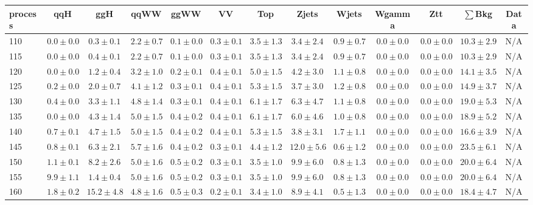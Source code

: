 \begin{table}
{%
 \tiny
 \begin{center}
 \begin{tabular}{l | c c | c c c c c c c c  | c c}
 \hline
 process & qqH & ggH & qqWW & ggWW & VV & Top & Zjets & Wjets & Wgamma & Ztt & $\sum$Bkg & Data \\
 \hline
110 & $0.0\pm0.0$ & $0.3\pm0.1$ & $2.2\pm0.7$ & $0.1\pm0.0$ & $0.3\pm0.1$ & $3.5\pm1.3$ & $3.4\pm2.4$ & $0.9\pm0.7$ & $0.0\pm0.0$ & $0.0\pm0.0$ & $10.3\pm2.9$ & N/A \\
115 & $0.0\pm0.0$ & $0.4\pm0.1$ & $2.2\pm0.7$ & $0.1\pm0.0$ & $0.3\pm0.1$ & $3.5\pm1.3$ & $3.4\pm2.4$ & $0.9\pm0.7$ & $0.0\pm0.0$ & $0.0\pm0.0$ & $10.3\pm2.9$ & N/A \\
120 & $0.0\pm0.0$ & $1.2\pm0.4$ & $3.2\pm1.0$ & $0.2\pm0.1$ & $0.4\pm0.1$ & $5.0\pm1.5$ & $4.2\pm3.0$ & $1.1\pm0.8$ & $0.0\pm0.0$ & $0.0\pm0.0$ & $14.1\pm3.5$ & N/A \\
125 & $0.2\pm0.0$ & $2.0\pm0.7$ & $4.1\pm1.2$ & $0.3\pm0.1$ & $0.4\pm0.1$ & $5.3\pm1.5$ & $3.7\pm3.0$ & $1.2\pm0.8$ & $0.0\pm0.0$ & $0.0\pm0.0$ & $14.9\pm3.7$ & N/A \\
130 & $0.4\pm0.0$ & $3.3\pm1.1$ & $4.8\pm1.4$ & $0.3\pm0.1$ & $0.4\pm0.1$ & $6.1\pm1.7$ & $6.3\pm4.7$ & $1.1\pm0.8$ & $0.0\pm0.0$ & $0.0\pm0.0$ & $19.0\pm5.3$ & N/A \\
135 & $0.0\pm0.0$ & $4.3\pm1.4$ & $5.0\pm1.5$ & $0.4\pm0.2$ & $0.4\pm0.1$ & $6.1\pm1.7$ & $6.0\pm4.6$ & $1.0\pm0.8$ & $0.0\pm0.0$ & $0.0\pm0.0$ & $18.9\pm5.2$ & N/A \\
140 & $0.7\pm0.1$ & $4.7\pm1.5$ & $5.0\pm1.5$ & $0.4\pm0.2$ & $0.4\pm0.1$ & $5.3\pm1.5$ & $3.8\pm3.1$ & $1.7\pm1.1$ & $0.0\pm0.0$ & $0.0\pm0.0$ & $16.6\pm3.9$ & N/A \\
145 & $0.8\pm0.1$ & $6.3\pm2.1$ & $5.7\pm1.6$ & $0.4\pm0.2$ & $0.3\pm0.1$ & $4.4\pm1.2$ & $12.0\pm5.6$ & $0.6\pm1.2$ & $0.0\pm0.0$ & $0.0\pm0.0$ & $23.5\pm6.1$ & N/A \\
150 & $1.1\pm0.1$ & $8.2\pm2.6$ & $5.0\pm1.6$ & $0.5\pm0.2$ & $0.3\pm0.1$ & $3.5\pm1.0$ & $9.9\pm6.0$ & $0.8\pm1.3$ & $0.0\pm0.0$ & $0.0\pm0.0$ & $20.0\pm6.4$ & N/A \\
155 & $9.9\pm1.1$ & $1.4\pm0.4$ & $5.0\pm1.6$ & $0.5\pm0.2$ & $0.3\pm0.1$ & $3.5\pm1.0$ & $9.9\pm6.0$ & $0.8\pm1.3$ & $0.0\pm0.0$ & $0.0\pm0.0$ & $20.0\pm6.4$ & N/A \\
160 & $1.8\pm0.2$ & $15.2\pm4.8$ & $4.8\pm1.6$ & $0.5\pm0.3$ & $0.2\pm0.1$ & $3.4\pm1.0$ & $8.9\pm4.1$ & $0.5\pm1.3$ & $0.0\pm0.0$ & $0.0\pm0.0$ & $18.4\pm4.7$ & N/A \\

\end{tabular}
\end{center}}
\end{table}
